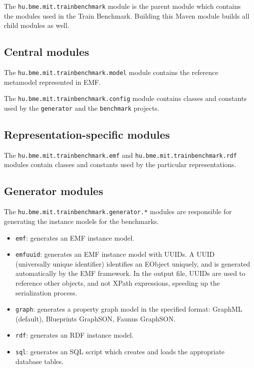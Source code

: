 The \texttt{hu.bme.mit.trainbenchmark} module is the parent module which contains the modules used in the Train Benchmark. Building this Maven module builds all child modules as well.

\subsection{Central modules}

The \texttt{hu.bme.mit.trainbenchmark.model} module contains the reference metamodel represented in EMF.

The \texttt{hu.bme.mit.trainbenchmark.config} module contains classes and constants used by the \texttt{generator} and the \texttt{benchmark} projects.

\subsection{Representation-specific modules}

The \texttt{hu.bme.mit.trainbenchmark.emf} and \texttt{hu.bme.mit.trainbenchmark.rdf} modules contain classes and constants used by the particular representations.

\subsection{Generator modules}

The \texttt{hu.bme.mit.trainbenchmark.generator.*} modules are responsible for generating the instance models for the benchmarks.

\begin{itemize}
  \item \texttt{emf}: generates an EMF instance model.
  \item \texttt{emfuuid}: generates an EMF instance model with UUIDs. A UUID (universally unique identifier) identifies an EObject uniquely, and is generated automatically by the EMF framework. In the output file, UUIDs are used to reference other objects, and not XPath expressions, speeding up the serialization process.
  \item \texttt{graph}: generates a property graph model in the specified format: GraphML (default), Blueprints GraphSON, Faunus GraphSON.
  \item \texttt{rdf}: generates an RDF instance model.
  \item \texttt{sql}: generates an SQL script which creates and loads the appropriate database tables.
\end{itemize}



